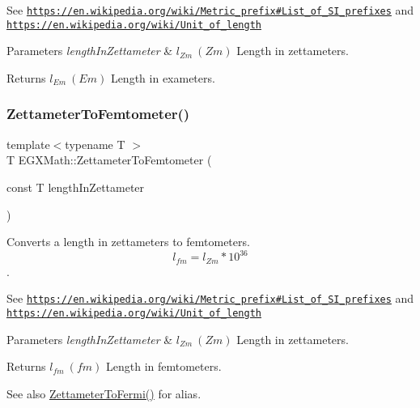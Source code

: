 See \href{https://en.wikipedia.org/wiki/Metric_prefix#List_of_SI_prefixes}{\tt https\+://en.\+wikipedia.\+org/wiki/\+Metric\+\_\+prefix\#\+List\+\_\+of\+\_\+\+S\+I\+\_\+prefixes} and \href{https://en.wikipedia.org/wiki/Unit_of_length}{\tt https\+://en.\+wikipedia.\+org/wiki/\+Unit\+\_\+of\+\_\+length} 
\begin{DoxyParams}{Parameters}
{\em length\+In\+Zettameter} & $ l_{Zm}\ (Zm)$ Length in zettameters. \\
\hline
\end{DoxyParams}
\begin{DoxyReturn}{Returns}
$ l_{Em}\ (Em)$ Length in exameters. 
\end{DoxyReturn}
\mbox{\label{group___e_g_x_math-_conversions-_length_conversions-_zettameter-_s_i_ga9af7bed274fea1c279796cd6113e79c4}} 
\subsubsection{\texorpdfstring{Zettameter\+To\+Femtometer()}{ZettameterToFemtometer()}}
{\footnotesize\ttfamily template$<$typename T $>$ \\
T E\+G\+X\+Math\+::\+Zettameter\+To\+Femtometer (\begin{DoxyParamCaption}\item[{const T}]{length\+In\+Zettameter }\end{DoxyParamCaption})}



Converts a length in zettameters to femtometers. \[ l_{fm}=l_{Zm} * 10^{36} \]. 

See \href{https://en.wikipedia.org/wiki/Metric_prefix#List_of_SI_prefixes}{\tt https\+://en.\+wikipedia.\+org/wiki/\+Metric\+\_\+prefix\#\+List\+\_\+of\+\_\+\+S\+I\+\_\+prefixes} and \href{https://en.wikipedia.org/wiki/Unit_of_length}{\tt https\+://en.\+wikipedia.\+org/wiki/\+Unit\+\_\+of\+\_\+length} 
\begin{DoxyParams}{Parameters}
{\em length\+In\+Zettameter} & $ l_{Zm}\ (Zm)$ Length in zettameters. \\
\hline
\end{DoxyParams}
\begin{DoxyReturn}{Returns}
$ l_{fm}\ (fm)$ Length in femtometers. 
\end{DoxyReturn}
\begin{DoxySeeAlso}{See also}
\mbox{\hyperlink{group___e_g_x_math-_conversions-_length_conversions-_zettameter-_non-_s_i_ga791b0a401fe813fe4e6a34490f12a817}{Zettameter\+To\+Fermi()}} for alias. 
\end{DoxySeeAlso}
\mbox{\label{group___e_g_x_math-_conversions-_length_conversions-_zettameter-_s_i_gab6673b4fa72a1c196d7fba1260e7f78a}} 
